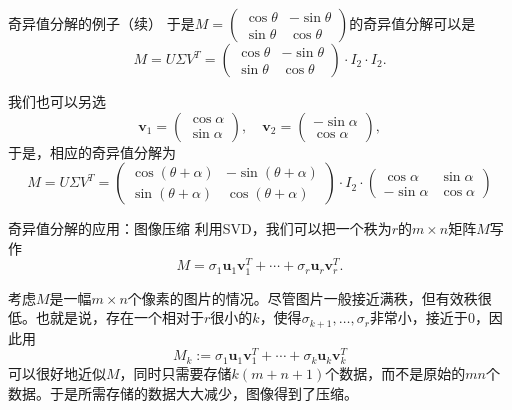 \begin{frame}

\begin{block}{奇异值分解的例子（续）}
于是$M = \begin{pmatrix} \cos\theta & -\sin\theta \\ \sin\theta & \cos\theta \end{pmatrix}$的奇异值分解可以是
$$M = U\Sigma V^T = \begin{pmatrix} \cos\theta & -\sin\theta \\ \sin\theta & \cos\theta \end{pmatrix} \cdot I_2 \cdot I_2.$$

\vspace{1em}
\pause

我们也可以另选
$$\mathbf{v}_1 = \begin{pmatrix} \cos\alpha \\ \sin\alpha \end{pmatrix}, \quad \mathbf{v}_2 = \begin{pmatrix} -\sin\alpha \\ \cos\alpha \end{pmatrix},$$
于是，相应的奇异值分解为
$$M = U\Sigma V^T = \begin{pmatrix} \cos(\theta+\alpha) & -\sin(\theta+\alpha) \\ \sin(\theta+\alpha) & \cos(\theta+\alpha) \end{pmatrix} \cdot I_2 \cdot \begin{pmatrix} \cos\alpha & \sin\alpha \\ -\sin\alpha & \cos\alpha \end{pmatrix}$$
\end{block}

\end{frame}


\begin{frame}

\begin{block}{奇异值分解的应用：图像压缩}
利用SVD，我们可以把一个秩为$r$的$m\times n$矩阵$M$写作
$$M = \sigma_1\mathbf{u}_1\mathbf{v}_1^T + \cdots + \sigma_r\mathbf{u}_r\mathbf{v}_r^T.$$

考虑$M$是一幅$m\times n$个像素的图片的情况。尽管图片一般接近满秩，但{\color{red}有效秩}很低。也就是说，存在一个相对于$r$很小的$k$，使得$\sigma_{k+1},\ldots,\sigma_{r}$非常小，接近于$0$，因此用
$$M_k := \sigma_1\mathbf{u}_1\mathbf{v}_1^T + \cdots + \sigma_k\mathbf{u}_k\mathbf{v}_k^T$$
可以很好地近似$M$，同时只需要存储$k(m+n+1)$个数据，而不是原始的$mn$个数据。于是所需存储的数据大大减少，图像得到了压缩。
\end{block}

\end{frame}

